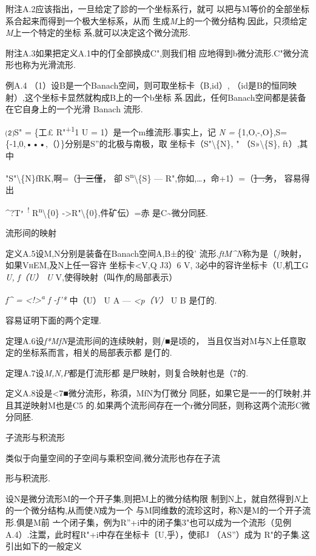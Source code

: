 \documentclass{article}
\begin{document}
附注A.2应该指出，一旦给定了診的一个坐标系行，就可
以把与M等价的全部坐标系合起来而得到一个极大坐标系，从而
生成\emph{M}上的一个微分结构.因此，只须给定\emph{M}上一个特定的坐标
系,就可以决定这个微分流形.

附注A.3如果把定义A.1中的仃全部换成C",则我们相
应地得到b微分流形.C"微分流形也称为光滑流形.

例A.4 （1）设B是一个Banach空间，则可取坐标卡（B,id）,
（id是B的恒同映射）,这个坐标卡显然就构成B上的一个b坐标
系.因此，任何Banach空间都是装备在它自身上的一个光滑 Banach 流形.

⑵S" = \{工£ R"\textsuperscript{+1}1 U\textbar{}\textbar{} =
1）是一个m维流形.事实上，记 \emph{N =} \{1,O,-,O\},S=
\{-1,0,•••,（）\}分别是S''的北极与南极，取
坐标卡（S"\textbackslash{}\{N\}, " （S»\textbackslash{}\{S\}, ft）,其中

"S"\textbackslash{}\{N\}fRK,啊=（\sout{］三僅}， 卻
S\textsuperscript{n}\textbackslash{}\{S\} ---
R",你如,\ldots{}，命+1）=（\sout{］.务}， 容易得出

\^{}?T\textsuperscript{，!} R\textsuperscript{n}\textbackslash{}\{0\}
-\textgreater{}R"\textbackslash{}\{0\},件矿伝）=赤
是C\textasciitilde{}微分同胚.

流形间的映射

定义A.5设M,N分别是装备在Banach空间A,B±的役'
流形.\emph{ftM\^{}N}称为是（/映射，如果\textsc{VhEM,}及N上任一容许
坐标卡\textless{}V,Q J3）6 V, 3必中的容许坐标卡（U,机工G \emph{U, f（U）
U} V,使得映射（叫作\emph{f}的局部表示）

\emph{f\^{} = \textless{}!\textgreater{}\textsuperscript{a} f -f'*}
中（U） U A --- \emph{\textless{}p（V）} U B 是仃的.

容易证明下面的两个定理.

定理A.6设\emph{f*MfN}是流形间的连续映射，则/■是顷的，
当且仅当对M与N上任意取定的坐标系而言，相关的局部表示都 是仃的.\textbar{}

定理A.7设\emph{M,N,P}都是仃流形都
是尸映射，则复合映射也是（7的.\textbar{}

定义A.8设是\textless{}7■微分流形，称須，MfN为仃微分
同胚，如果它是一一的仃映射,并且其逆映射M也是C5
的.如果两个流形间存在一个r微分同胚，则称这两个流形C微 分同胚.

子流形与积流形

类似于向量空间的子空间与乘积空间,微分流形也存在子流

形与积流形.

设N是微分流形M的一个开子集,则把M上的微分结构限
制到N上，就自然得到\emph{N}上的一个微分结构,从而使\emph{N}成为一个
与M同维数的流珍这时，称N是M的一个开子流形.俱是M前
亠个闭子集，例为R''+i中的闭子集3"也可以成为一个流形（见例
A.4）.注鬻，此时程R"+i中存在坐标卡〔U,乎），使祁J （AS''）成为
R"的子集.这引出如下的一般定义
\end{document}
